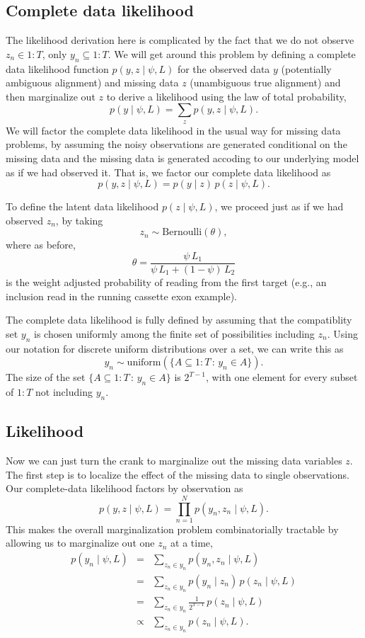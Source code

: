 \documentclass[11pt]{report}
\newcommand{\rngto}[1]{1{:}#1}
\newcommand{\setcomp}[2]{\{ #1 \, : \, #2 \}}
\begin{document}
\subsection{Complete data likelihood}

The likelihood derivation here is complicated by the fact that we do
not observe $z_n \in \rngto{T}$, only $y_n \subseteq \rngto{T}$.  We
will get around this problem by defining a complete data likelihood
function $p(y, z \mid \psi, L)$ for the observed data $y$ (potentially
ambiguous alignment) and missing data $z$ (unambiguous true alignment)
and then marginalize out $z$ to derive a likelihood using the law of
total probability,
\[
  p(y \mid \psi, L) = \sum_z p(y, z \mid \psi, L).
\]
We will factor the complete data likelihood in the usual way for
missing data problems, by assuming the noisy observations are 
generated conditional on the missing data and the missing data is
generated accoding to our underlying model as if we had observed it.
That is, we factor our complete data likelihood as 
\[
  p(y, z \mid \psi, L) = p(y \mid z) \, p(z \mid \psi, L).
\]

To define the latent data likelihood $p(z \mid \psi, L)$, we proceed
just as if we had observed $z_n$, by taking
\[
  z_n \sim \textrm{Bernoulli}(\theta),
\]
where as before,
\[
  \theta = \frac{\psi \, L_1}{\psi \, L_1 + (1 - \psi) \, L_2}
\]
is the weight adjusted probability of reading from the first target
(e.g., an inclusion read in the running cassette exon example).

The complete data likelihood is fully defined by
assuming that the compatiblity set $y_n$ is chosen uniformly among
the finite set of possibilities including $z_n$.  Using our notation
for discrete uniform distributions over a set, we can write this as
\[
  y_n \sim \textrm{uniform}\!\left(\setcomp{A \subseteq \rngto{T}}{y_n
      \in A}\right).
\]
The size of the set $\setcomp{A \subseteq \rngto{T}}{y_n \in A}$ is
$2^{T-1}$, with one element for every subset of $\rngto{T}$ not
including $y_n$.

\subsection{Likelihood}

Now we can just turn the crank to marginalize out the missing data
variables $z$.  The first step is to localize the effect of the
missing data to single observations.  Our complete-data likelihood
factors by observation as
\[
  p(y, z \mid \psi, L)
  = \prod_{n=1}^N p(y_n, z_n \mid \psi, L).
\]
This makes the overall marginalization problem combinatorially
tractable by allowing us to marginalize out one $z_n$ at a time,
%
\begin{eqnarray*}
  p(y_n \mid \psi, L)
  & = & \sum_{z_n \in y_n} p(y_n, z_n \mid \psi, L)
  \\
  & = & \sum_{z_n \in y_n} p(y_n \mid z_n) \, p(z_n \mid \psi, L)
  \\
  & = & \sum_{z_n \in y_n} \frac{1}{2^{T-1}} \, p(z_n \mid \psi, L)
  \\
  & \propto & \sum_{z_n \in y_n} p(z_n \mid \psi, L).
\end{eqnarray*}
\end{document}
